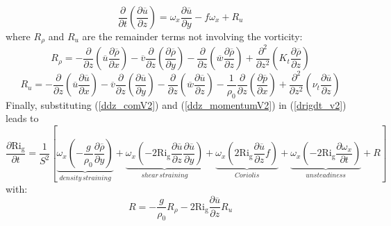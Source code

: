 \begin{equation}
\frac{\partial}{\partial t} \left( \frac{\partial \overline{u}}{\partial z} \right) =  \omega_x \frac{\partial \overline{u}}{\partial y} - f \omega_x + R_u
\label{ddz_momentumV2}
\end{equation}
where $R_\rho$ and $R_u$ are the remainder terms not involving the vorticity:
\begin{equation}
R_\rho = - \frac{\partial}{\partial z} \left(  \overline{u} \frac{\partial \overline{\rho}}{\partial x} \right) -  \overline{v} \frac{\partial}{\partial z} \left( \frac{\partial \overline{\rho}}{\partial y} \right) - \frac{\partial}{\partial z} \left( \overline{w} \frac{\partial \overline{\rho}}{\partial z} \right) + \frac{\partial^2}{\partial z^2}\left( K_{t} \frac{\partial \overline{\rho}}{\partial z} \right)
\label{r_rho}
\end{equation}
\begin{equation}
R_u = - \frac{\partial}{\partial z} \left(  \overline{u} \frac{\partial \overline{u}}{\partial x} \right) - \overline{v} \frac{\partial}{\partial z} \left( \frac{\partial \overline{u}}{\partial y} \right) - \frac{\partial}{\partial z} \left( \overline{w} \frac{\partial \overline{u}}{\partial z} \right)  -\frac{1}{\rho_0} \frac{\partial}{\partial z}\left(\frac{\partial \overline{p}}{\partial x}\right) + \frac{\partial^2}{\partial z^2}\left( \nu_{t} \frac{\partial \overline{u}}{\partial z} \right)
\label{r_u}
\end{equation}
Finally, substituting (\ref{ddz_comV2}) and (\ref{ddz_momentumV2}) in (\ref{drigdt_v2}) leads to
\begin{equation}
\frac{\partial \mathrm{Ri_g}}{\partial t}=\frac{1}{S^{2}}\left[\underbrace{\omega_{x}\left(-\frac{g}{\rho_{0}}\frac{\partial \overline{\rho}}{\partial y}\right)}_{density\, straining}+\underbrace{\omega_{x}\left(-2\mathrm{Ri_g}\frac{\partial \overline{u}}{\partial z}\frac{\partial \overline{u}}{\partial y}\right)}_{shear\, straining}+\underbrace{\omega_{x}\left(2\mathrm{Ri_g}\frac{\partial \overline{u}}{\partial z}f\right)}_{Coriolis}+\underbrace{\omega_{x}\left(-2\mathrm{Ri_g} \frac{\partial \omega_x}{\partial t}\right)}_{unsteadiness}+R\right]
\label{drigdt_final}
\end{equation}
with:
\begin{equation}
R = -\frac{g}{\rho_0} R_\rho - 2 \mathrm{Ri_g} \frac{\partial \overline{u}}{\partial z} R_u 
\label{remainder}
\end{equation}

